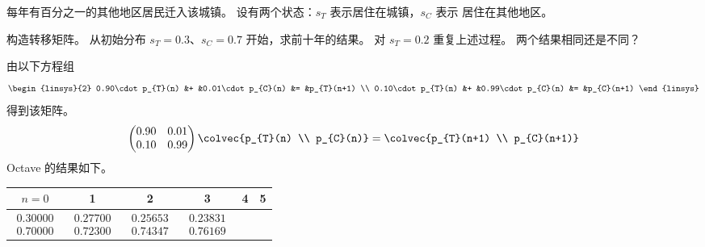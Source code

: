 \begin{exercises}
     每年有百分之一的其他地区居民迁入该城镇。
     设有两个状态：$s_T$ 表示居住在城镇，$s_C$ 表示
     居住在其他地区。
     \begin{exparts}
       \partsitem 构造转移矩阵。
       \partsitem 从初始分布 $s_T=0.3$、$s_C=0.7$ 开始，求前十年的结果。
       \partsitem 对 $s_T=0.2$ 重复上述过程。
       \partsitem 两个结果相同还是不同？
     \end{exparts}
     \begin{answer}
       \begin{exparts}
         \partsitem 由以下方程组
           \begin{equation*}
             \begin{linsys}{2}
               0.90\cdot p_{T}(n)  &+  &0.01\cdot p_{C}(n) &= &p_{T}(n+1)   \\
               0.10\cdot p_{T}(n)  &+  &0.99\cdot p_{C}(n) &= &p_{C}(n+1)   
             \end{linsys}
           \end{equation*}
           得到该矩阵。
           \begin{equation*}
             \begin{pmatrix}
               0.90  &0.01  \\
               0.10  &0.99
             \end{pmatrix}
             \colvec{p_{T}(n) \\ p_{C}(n)}
             =
             \colvec{p_{T}(n+1) \\ p_{C}(n+1)}
           \end{equation*}
         \partsitem Octave 的结果如下。
           \begin{center}
             \begin{tabular}{c|ccccc}
               $n=0$ &1  &2  &3  &4  &5  \\ 
               \hline
               $\begin{array}{c}  0.30000 \\ 0.70000 \end{array}$
               &$\begin{array}{c} 0.27700 \\ 0.72300 \end{array}$
               &$\begin{array}{c}  0.25653 \\ 0.74347 \end{array}$
               &$\begin{array}{c}  0.23831 \\ 0.76169 \end{array}$

\end{tabular}
\end{center}
\end{exparts}
\end{answer}
\end{exercises}
